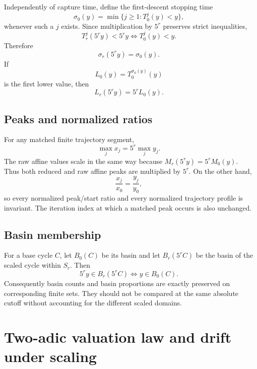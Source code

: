 \documentclass[11pt]{article}
\theoremstyle{remark}
\begin{document}
Independently of capture time, define the first-descent stopping time
\[
\sigma_0(y)=\min\{j\ge1:T_0^j(y)<y\},
\]
whenever such a $j$ exists.  Since multiplication by $5^r$ preserves strict inequalities,
\[
T_r^j(5^ry)<5^ry
\iff
T_0^j(y)<y.
\]
Therefore
\begin{equation}
\sigma_r(5^ry)=\sigma_0(y).
\label{eq:stopping}
\end{equation}
If
\[
L_0(y)=T_0^{\sigma_0(y)}(y)
\]
is the first lower value, then
\begin{equation}
L_r(5^ry)=5^rL_0(y).
\label{eq:firstlower}
\end{equation}

\subsection{Peaks and normalized ratios}

For any matched finite trajectory segment,
\begin{equation}
\max_j x_j=5^r\max_j y_j.
\label{eq:peak}
\end{equation}
The raw affine values scale in the same way because $M_r(5^ry)=5^rM_0(y)$.  Thus both reduced and raw affine peaks are multiplied by $5^r$.  On the other hand,
\begin{equation}
\frac{x_j}{x_0}=\frac{y_j}{y_0},
\label{eq:ratio}
\end{equation}
so every normalized peak/start ratio and every normalized trajectory profile is invariant.  The iteration index at which a matched peak occurs is also unchanged.

\subsection{Basin membership}

For a base cycle $C$, let $B_0(C)$ be its basin and let $B_r(5^rC)$ be the basin of the scaled cycle within $S_r$.  Then
\begin{equation}
5^ry\in B_r(5^rC)
\iff
y\in B_0(C).
\label{eq:basin}
\end{equation}
Consequently basin counts and basin proportions are exactly preserved on corresponding finite sets.  They should not be compared at the same absolute cutoff without accounting for the different scaled domains.

\section{Two-adic valuation law and drift under scaling}
\end{document}
